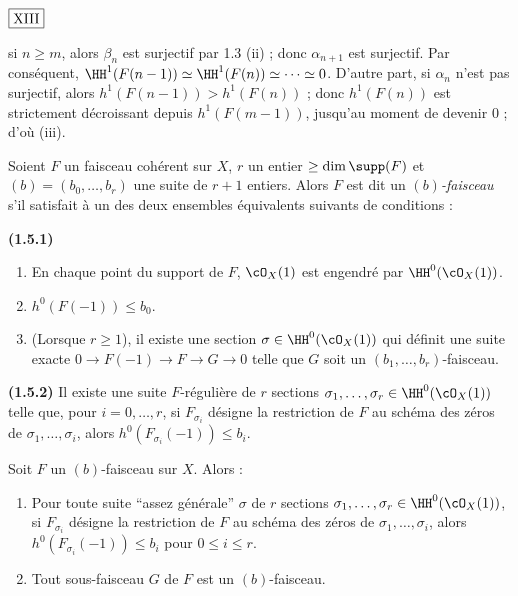 \begin{flushright}
$\fbox{\text{XIII}}$
\end{flushright}

\noindent
si $n \geq m$, alors $\beta_n$ est surjectif par 1.3 (ii) ; donc $\alpha_{n+1}$ est surjectif. Par conséquent, $\HH^1(F(n-1)) \simeq \HH^1(F(n)) \simeq \cdots \simeq 0$. D'autre part, si $\alpha_n$ n'est pas surjectif, alors $h^1(F(n-1)) > h^1(F(n))$ ; donc $h^1(F(n))$ est strictement décroissant depuis $h^1(F(m-1))$, jusqu'au moment de devenir $0$ ; d'où (iii).

\begin{defn}\label{def:1.5} Soient $F$ un faisceau cohérent sur $X$, $r$ un entier $\geq \dim \supp(F)$ et $(b) = (b_0, \ldots, b_r)$ une suite de $r+1$ entiers. Alors $F$ est dit un \emph{$(b)$-faisceau} s'il satisfait à un des deux ensembles équivalents suivants de conditions :

\smallskip
\noindent\textbf{(1.5.1)}\begin{enumerate}[label={\roman*)}]
\item En chaque point du support de $F$, $\cO_X(1)$ est engendré par $\HH^0(\cO_X(1))$.
\item $h^0(F(-1)) \leq b_0$.
\item (Lorsque $r \geq 1$), il existe une section $\sigma \in \HH^0(\cO_X(1))$ qui définit une suite exacte $0 \to F(-1) \to F \to G \to 0$ telle que $G$ soit un $(b_1, \ldots, b_r)$-faisceau.
\end{enumerate}

\smallskip
\noindent\textbf{(1.5.2)} Il existe une suite $F$-régulière de $r$ sections $\sigma_1, \ldots, \sigma_r \in \HH^0(\cO_X(1))$ telle que, pour $i = 0, \ldots, r$, si $F_{\sigma_i}$ désigne la restriction de $F$ au schéma des zéros de $\sigma_1, \ldots, \sigma_i$, alors $h^0(F_{\sigma_i}(-1)) \leq b_i$.
\end{defn}

\begin{prop}\label{prop:1.6} Soit $F$ un $(b)$-faisceau sur $X$. Alors :
\begin{enumerate}[label={\roman*)}]
\item Pour toute suite ``assez générale'' $\sigma$ de $r$ sections $\sigma_1, \ldots, \sigma_r \in \HH^0(\cO_X(1))$, si $F_{\sigma_i}$ désigne la restriction de $F$ au schéma des zéros de $\sigma_1, \ldots, \sigma_i$, alors $h^0(F_{\sigma_i}(-1)) \leq b_i$ pour $0 \leq i \leq r$.
\item Tout sous-faisceau $G$ de $F$ est un $(b)$-faisceau.
\end{enumerate}
\end{prop}

